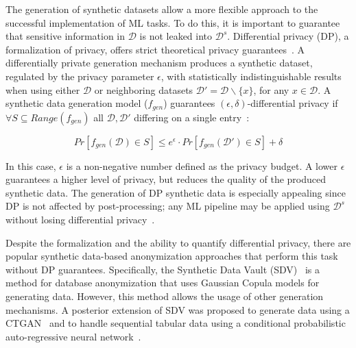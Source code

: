 \documentclass[parskip=full]{scrartcl}
\begin{document}
The generation of synthetic datasets allow a more flexible approach to the
successful implementation of ML tasks. To do this, it is important to
guarantee that sensitive information in $\mathcal{D}$ is not leaked into
$\mathcal{D}^s$. Differential privacy (DP), a formalization of privacy, offers
strict theoretical privacy guarantees~\cite{rosenblatt2020differentially}. A
differentially private generation mechanism produces a synthetic dataset,
regulated by the privacy parameter $\epsilon$, with statistically
indistinguishable results when using either $\mathcal{D}$ or neighboring
datasets $\mathcal{D}' = \mathcal{D} \backslash \{x\}$, for any $x \in
\mathcal{D}$. A synthetic data generation model ($f_{gen}$) guarantees
$(\epsilon, \delta)$-differential privacy if $\forall S \subseteq
Range(f_{gen})$ all $\mathcal{D}, \mathcal{D}'$ differing on a single
entry~\cite{hardt2012simple}:

\begin{equation}
    Pr[f_{gen}(\mathcal{D}) \in S] \le e^{\epsilon} \cdot
    Pr[f_{gen}(\mathcal{D}') \in S] + \delta
\end{equation}
 
In this case, $\epsilon$ is a non-negative number defined as the privacy
budget. A lower $\epsilon$ guarantees a higher level of privacy, but reduces
the quality of the produced synthetic data. The generation of DP synthetic
data is especially appealing since DP is not affected by post-processing; any
ML pipeline may be applied using $\mathcal{D}^s$ without losing differential
privacy~\cite{dwork2014algorithmic}.

Despite the formalization and the ability to quantify differential privacy,
there are popular synthetic data-based anonymization approaches that perform
this task without DP guarantees. Specifically, the Synthetic Data Vault
(SDV)~\cite{patki2016synthetic} is a method for database anonymization that
uses Gaussian Copula models for generating data. However, this method allows
the usage of other generation mechanisms. A posterior extension of SDV was
proposed to generate data using a CTGAN~\cite{xu2019modeling} and to handle
sequential tabular data using a conditional probabilistic auto-regressive
neural network~\cite{zhang2022sequential}. 
\end{document}
